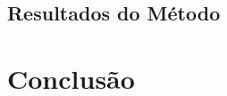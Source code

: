 \documentclass[
	12pt,				%
	openright,			%
	oneside,			%
	a4paper,			%
	english,			%
	french,				%
	spanish,			%
	brazil,				%
	]{abntex2}
\begin{document}
\section{Resultados do Método}
\label{sec: resultados}



 \chapter{Conclusão}
 \label{ch: conclusao}
 



% 

\postextual




%
%








\printindex
\end{document}
